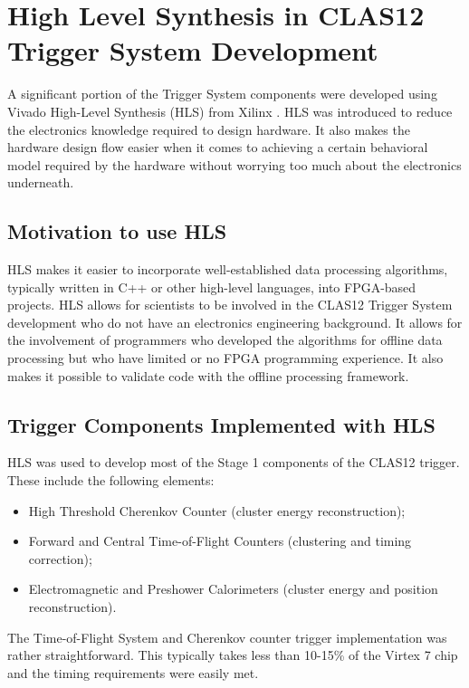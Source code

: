 \section{High Level Synthesis in CLAS12 Trigger System Development}
\label{sec:hls}

A significant portion of the Trigger System components were developed using Vivado High-Level Synthesis (HLS) from Xilinx \cite{hls-ref}. HLS was introduced to reduce the electronics knowledge required to design hardware. It also makes the hardware design flow easier when it comes to achieving a certain behavioral model required by the hardware without worrying too much about the electronics underneath.

\subsection{Motivation to use HLS}

HLS makes it easier to incorporate well-established data processing algorithms, typically written in C++ or other high-level languages, into FPGA-based projects. HLS allows for scientists to be involved in the CLAS12 Trigger System development who do not have an electronics engineering background. It allows for the involvement of programmers who developed the algorithms for offline data processing but who have limited or no FPGA programming experience. It also makes it possible to validate code with the offline processing framework.

\subsection{Trigger Components Implemented with HLS}

HLS was used to develop most of the Stage 1 components of the CLAS12 trigger. These include the following elements:

\begin{itemize}
	\item High Threshold Cherenkov Counter (cluster energy reconstruction);
	\item Forward and Central Time-of-Flight Counters (clustering and timing correction);
	\item Electromagnetic and Preshower Calorimeters (cluster energy and position reconstruction).
\end{itemize}

The Time-of-Flight System and Cherenkov counter trigger implementation was rather straightforward. This typically takes less than 10-15\% of the Virtex 7 chip and the timing requirements were easily met.

